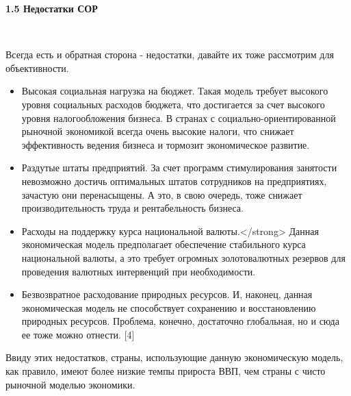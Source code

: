 \documentclass[14pt,a4paper]{article}
\begin{document}
    \begin{center}
        \textbf{1.5 Недостатки СОР}
    \end{center}
    \\
    \par
    Всегда есть и обратная сторона - недостатки, давайте их тоже рассмотрим для объективности.
    \begin{itemize}
        \item Высокая социальная нагрузка на бюджет. Такая модель требует высокого
        уровня социальных расходов бюджета, что достигается за счет высокого уровня
        налогообложения бизнеса. В странах с социально-ориентированной рыночной экономикой
        всегда очень высокие налоги, что снижает эффективность ведения бизнеса и тормозит
        экономическое развитие.
        \item Раздутые штаты предприятий. За счет программ стимулирования занятости
        невозможно достичь оптимальных штатов сотрудников на предприятиях, зачастую они
        перенасыщены. А это, в свою очередь, тоже снижает производительность труда и
        рентабельность бизнеса.
        \item Расходы на поддержку курса национальной валюты.</strong> Данная экономическая
        модель предполагает обеспечение стабильного курса национальной валюты, а это требует
        огромных золотовалютных резервов для проведения валютных интервенций при необходимости.
        \item Безвозвратное расходование природных ресурсов. И, наконец, данная
        экономическая модель не способствует сохранению и восстановлению природных ресурсов.
        Проблема, конечно, достаточно глобальная, но и сюда ее тоже можно отнести. [4]
    \end{itemize}
    \par
    Ввиду этих недостатков, страны, использующие данную экономическую модель, как
    правило, имеют более низкие темпы прироста ВВП, чем страны с чисто рыночной моделью
    экономики.
\end{document}
